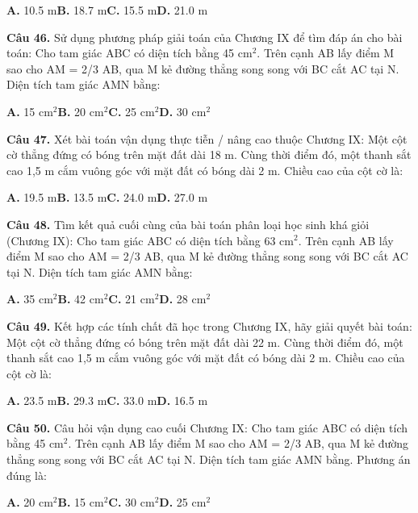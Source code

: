 \documentclass[11pt,a4paper]{article}
\begin{document}
\hspace*{1.5em}\textbf{A.} 10.5 m\quad\quad \textbf{B.} 18.7 m\quad\quad \textbf{C.} 15.5 m\quad\quad \textbf{D.} 21.0 m\par\vspace{2pt}
\textbf{\color{primary} Câu 46.} Sử dụng phương pháp giải toán của Chương IX để tìm đáp án cho bài toán: Cho tam giác ABC có diện tích bằng 45 cm$^2$. Trên cạnh AB lấy điểm M sao cho AM = 2/3 AB, qua M kẻ đường thẳng song song với BC cắt AC tại N. Diện tích tam giác AMN bằng:\par
\hspace*{1.5em}\textbf{A.} 15 cm$^2$\quad\quad \textbf{B.} 20 cm$^2$\quad\quad \textbf{C.} 25 cm$^2$\quad\quad \textbf{D.} 30 cm$^2$\par\vspace{2pt}
\textbf{\color{primary} Câu 47.} Xét bài toán vận dụng thực tiễn / nâng cao thuộc Chương IX: Một cột cờ thẳng đứng có bóng trên mặt đất dài 18 m. Cùng thời điểm đó, một thanh sắt cao 1,5 m cắm vuông góc với mặt đất có bóng dài 2 m. Chiều cao của cột cờ là:\par
\hspace*{1.5em}\textbf{A.} 19.5 m\quad\quad \textbf{B.} 13.5 m\quad\quad \textbf{C.} 24.0 m\quad\quad \textbf{D.} 27.0 m\par\vspace{2pt}
\textbf{\color{primary} Câu 48.} Tìm kết quả cuối cùng của bài toán phân loại học sinh khá giỏi (Chương IX): Cho tam giác ABC có diện tích bằng 63 cm$^2$. Trên cạnh AB lấy điểm M sao cho AM = 2/3 AB, qua M kẻ đường thẳng song song với BC cắt AC tại N. Diện tích tam giác AMN bằng:\par
\hspace*{1.5em}\textbf{A.} 35 cm$^2$\quad\quad \textbf{B.} 42 cm$^2$\quad\quad \textbf{C.} 21 cm$^2$\quad\quad \textbf{D.} 28 cm$^2$\par\vspace{2pt}
\textbf{\color{primary} Câu 49.} Kết hợp các tính chất đã học trong Chương IX, hãy giải quyết bài toán: Một cột cờ thẳng đứng có bóng trên mặt đất dài 22 m. Cùng thời điểm đó, một thanh sắt cao 1,5 m cắm vuông góc với mặt đất có bóng dài 2 m. Chiều cao của cột cờ là:\par
\hspace*{1.5em}\textbf{A.} 23.5 m\quad\quad \textbf{B.} 29.3 m\quad\quad \textbf{C.} 33.0 m\quad\quad \textbf{D.} 16.5 m\par\vspace{2pt}
\textbf{\color{primary} Câu 50.} Câu hỏi vận dụng cao cuối Chương IX: Cho tam giác ABC có diện tích bằng 45 cm$^2$. Trên cạnh AB lấy điểm M sao cho AM = 2/3 AB, qua M kẻ đường thẳng song song với BC cắt AC tại N. Diện tích tam giác AMN bằng. Phương án đúng là:\par
\hspace*{1.5em}\textbf{A.} 20 cm$^2$\quad\quad \textbf{B.} 15 cm$^2$\quad\quad \textbf{C.} 30 cm$^2$\quad\quad \textbf{D.} 25 cm$^2$\par\vspace{2pt}
\end{document}
